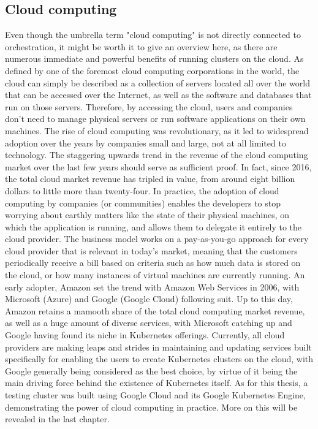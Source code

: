 \documentclass[thesis=B,english]{FITthesis}[2019/12/23]
\begin{document}
\subsection{Cloud computing}

Even though the umbrella term "cloud computing" is not directly connected to orchestration, it might be worth it to give an overview here, as there are numerous immediate and powerful benefits of running clusters on the cloud.
\newline
As defined by one of the foremost cloud computing corporations in the world, the cloud can simply be described as a collection of servers located all over the world that can be accessed over the Internet, as well as the software and databases that run on those servers. Therefore, by accessing the cloud, users and companies don't need to manage physical servers or run software applications on their own machines. \cite{cloudflare} The rise of cloud computing was revolutionary, as it led to widespread adoption over the years by companies small and large, not at all limited to technology. The staggering upwards trend in the revenue of the cloud computing market over the last few years should serve as sufficient proof. In fact, since 2016, the total cloud market revenue has tripled in value, from around eight billion dollars to little more than twenty-four. \cite{cloud-market}
\newline
In practice, the adoption of cloud computing by companies (or communities) enables the developers to stop worrying about earthly matters like the state of their physical machines, on which the application is running, and allows them to delegate it entirely to the cloud provider. The business model works on a pay-as-you-go approach for every cloud provider that is relevant in today's market, meaning that the customers periodically receive a bill based on criteria such as how much data is stored on the cloud, or how many instances of virtual machines are currently running. \cite{aws-framework} An early adopter, Amazon set the trend with Amazon Web Services in 2006, with Microsoft (Azure) and Google (Google Cloud) following suit. Up to this day, Amazon retains a mamooth share of the total cloud computing market revenue, as well as a huge amount of diverse services, with Microsoft catching up and Google having found its niche in Kubernetes offerings. Currently, all cloud providers are making leaps and strides in maintaining and updating services built specifically for enabling the users to create Kubernetes clusters on the cloud, with Google generally being considered as the best choice, by virtue of it being the main driving force behind the existence of Kubernetes itself.
\newline
As for this thesis, a testing cluster was built using Google Cloud and its Google Kubernetes Engine, demonstrating the power of cloud computing in practice. More on this will be revealed in the last chapter.
\end{document}
